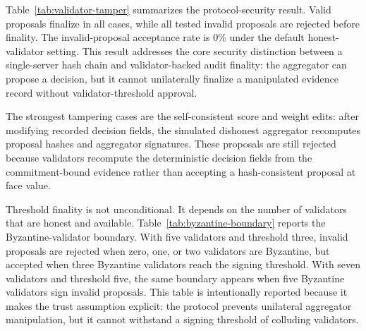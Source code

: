 \documentclass[preprint,12pt]{elsarticle}
\begin{document}
Table~\ref{tab:validator-tamper} summarizes the protocol-security result. Valid proposals finalize in all cases, while all tested invalid proposals are rejected before finality. The invalid-proposal acceptance rate is 0\% under the default honest-validator setting. This result addresses the core security distinction between a single-server hash chain and validator-backed audit finality: the aggregator can propose a decision, but it cannot unilaterally finalize a manipulated evidence record without validator-threshold approval.

The strongest tampering cases are the self-consistent score and weight edits: after modifying recorded decision fields, the simulated dishonest aggregator recomputes proposal hashes and aggregator signatures. These proposals are still rejected because validators recompute the deterministic decision fields from the commitment-bound evidence rather than accepting a hash-consistent proposal at face value.

\begin{table}[t]
\centering
\caption{Validator-backed finality under aggregator and payload tampering. Values summarize 39 proposed-method runs and 3600 valid audit blocks; higher valid finalization/rejection and lower invalid acceptance are better.}
\label{tab:validator-tamper}
\end{table}

Threshold finality is not unconditional. It depends on the number of validators that are honest and available. Table~\ref{tab:byzantine-boundary} reports the Byzantine-validator boundary. With five validators and threshold three, invalid proposals are rejected when zero, one, or two validators are Byzantine, but accepted when three Byzantine validators reach the signing threshold. With seven validators and threshold five, the same boundary appears when five Byzantine validators sign invalid proposals. This table is intentionally reported because it makes the trust assumption explicit: the protocol prevents unilateral aggregator manipulation, but it cannot withstand a signing threshold of colluding validators.
\end{document}
